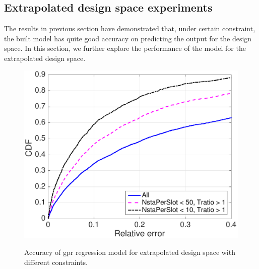 \subsection{Extrapolated design space experiments}


 
 The results in previous section have demonstrated that, under certain constraint, the built model has quite good accuracy on predicting the output for the design space. In this section, we further explore the performance of the model for the extrapolated design space.
 
 
 \begin{figure}[t]
    \centering
{\includegraphics[width=0.8\columnwidth]{figures/Extend_constraint}}
  \caption{Accuracy of \gls{gpr} regression model for extrapolated design space with different constraints. \label{fig:cdf_constraint_extended}}
\end{figure}
 
